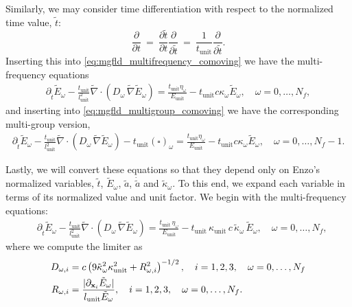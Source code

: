 \documentclass[10pt]{article}
\renewcommand{\(}{\left(}
\renewcommand{\)}{\right)}
\newcommand{\xvec}{{\bf x}}
\newcommand{\Lunit}{l_{\text{unit}}}
\newcommand{\Tunit}{t_{\text{unit}}}
\newcommand{\Eunit}{E_{\text{unit}}}
\newcommand{\Kunit}{\kappa_{\text{unit}}}
\newcommand{\tK}{\tilde{\kappa}}
\newcommand{\tT}{\tilde{t}}
\newcommand{\tE}{\tilde{E}}
\newcommand{\tA}{\tilde{a}}
\newcommand{\tnabla}{\tilde{\nabla}}
\begin{document}
Similarly, we may consider time differentiation with respect to the
normalized time value, $\tT$:
\[
   \frac{\partial}{\partial t} \ = \
   \frac{\partial \tT}{\partial t} \frac{\partial}{\partial \tT} \ = \
   \frac{1}{\Tunit}\frac{\partial}{\partial \tT}.
\]
Inserting this into \eqref{eq:mgfld_multifrequency_comoving} we have
the multi-frequency equations
\begin{align}
  \label{eq:mgfld_multifrequency_tnormalized}
  \partial_{\tT} \tE_{\omega} - \frac{\Tunit}{\Lunit^2}\tnabla\cdot\(D_{\omega}\,\tnabla \tE_{\omega}\)
    = \frac{\Tunit\eta_{\omega}}{\Eunit} - \Tunit c\kappa_{\omega} \tE_{\omega}, \quad \omega=0,\ldots,N_f,
\end{align}
and inserting into \eqref{eq:mgfld_multigroup_comoving} we have the
corresponding multi-group version,
\begin{align}
  \label{eq:mgfld_multigroup_tnormalized}
  \partial_{\tT} \tE_{\omega} - \frac{\Tunit}{\Lunit^2}\tnabla\cdot(D_{\omega}\,\tnabla \tE_{\omega}) -
    \Tunit(\square)_{\omega} = \frac{\Tunit\eta_{\omega}}{\Eunit} - 
    \Tunit c \kappa_{\omega} \tE_{\omega}, \quad \omega=0,\ldots,N_f-1.
\end{align}


Lastly, we will convert these equations so that they depend only on
Enzo's normalized variables, $\tT$, $\tE_{\omega}$, $\tA$, $\dot{\tA}$ and
$\tK_{\omega}$.  To this end, we expand each variable in terms of its
normalized value and unit factor.  We begin with the multi-frequency
equations: 
\begin{align}
  \label{eq:mgfld_multifrequency_comoving_normalized}
  &\partial_{\tT} \tE_{\omega} - \frac{\Tunit}{\Lunit^2}\tnabla\cdot\(D_{\omega}\,\tnabla \tE_{\omega}\)
    = \frac{\Tunit\,\eta_{\omega}}{\Eunit} - \Tunit\, \Kunit\, c\, \tK_{\omega}\, \tE_{\omega}, \quad
    \omega=0,\ldots,N_f,
\end{align}
where we compute the limiter as
\begin{align}
  \label{eq:Morel_limiterD_normalized}
  D_{\omega,i} &= c \left(9\tK_{\omega}^2\Kunit^2 +
  R_{\omega,i}^2\right)^{-1/2}, \quad i=1,2,3,\quad \omega=0,\ldots,N_f\\
  \label{eq:Morel_limiterR_normalized}
  R_{\omega,i} &= \frac{|\partial_{\xvec_i}\tE_{\omega}|}{\Lunit \tE_{\omega}}, \quad i=1,2,3,\quad \omega=0,\ldots,N_f.
\end{align}
\end{document}
